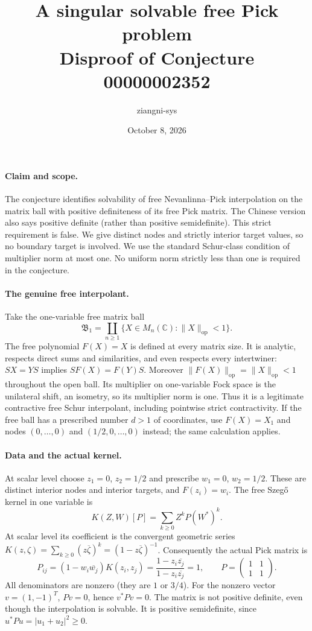 \documentclass[11pt]{article}
\title{A singular solvable free Pick problem\\Disproof of Conjecture 00000002352}
\author{ziangni-sys}
\date{October 8, 2026}
\begin{document}
\maketitle
\paragraph{Claim and scope.}
The conjecture identifies solvability of free Nevanlinna--Pick interpolation
on the matrix ball with positive definiteness of its free Pick matrix.
The Chinese version also says positive definite (rather than positive
semidefinite). This strict requirement is false. We give distinct nodes
and strictly interior target values, so no boundary target is involved.
We use the standard Schur-class condition of multiplier norm at most one.
No uniform norm strictly less than one is required in the conjecture.

\paragraph{The genuine free interpolant.}
Take the one-variable free matrix ball
\[
 \mathfrak B_1=\coprod_{n\geq1}\{X\in M_n(\mathbb C):\|X\|_{\mathrm{op}}<1\}.
\]
The free polynomial $F(X)=X$ is defined at every matrix size. It is
analytic, respects direct sums and similarities, and even respects every
intertwiner: $SX=YS$ implies $SF(X)=F(Y)S$. Moreover
$\|F(X)\|_{\mathrm{op}}=\|X\|_{\mathrm{op}}<1$ throughout the open ball.
Its multiplier on one-variable Fock space is the unilateral shift,
an isometry, so its multiplier norm is one. Thus it is a legitimate
contractive free Schur interpolant, including pointwise strict contractivity.
If the free ball has a prescribed number $d>1$ of coordinates, use
$F(X)=X_1$ and nodes $(0,\ldots,0)$ and $(1/2,0,\ldots,0)$ instead;
the same calculation applies.

\paragraph{Data and the actual kernel.}
At scalar level choose $z_1=0$, $z_2=1/2$ and prescribe
$w_1=0$, $w_2=1/2$. These are distinct interior nodes and interior
targets, and $F(z_i)=w_i$. The free Szeg\H{o} kernel in one variable is
\[
 K(Z,W)[P]=\sum_{k\geq0}Z^kP(W^*)^k.
\]
At scalar level its coefficient is the convergent geometric series
$K(z,\zeta)=\sum_{k\geq0}(z\overline\zeta)^k
=(1-z\overline\zeta)^{-1}$. Consequently the actual Pick matrix is
\[
 P_{ij}=(1-w_i\overline{w_j})K(z_i,z_j)
       =\frac{1-z_i\overline{z_j}}{1-z_i\overline{z_j}}=1,
 \qquad
 P=\begin{pmatrix}1&1\\1&1\end{pmatrix}.
\]
All denominators are nonzero (they are $1$ or $3/4$).
For the nonzero vector $v=(1,-1)^T$, $Pv=0$, hence $v^*Pv=0$.
The matrix is not positive definite, even though the interpolation is
solvable. It is positive semidefinite, since
$u^*Pu=|u_1+u_2|^2\geq0$.
\end{document}
